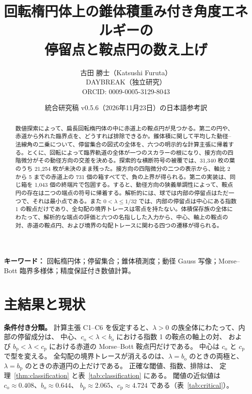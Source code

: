 \documentclass[11pt,a4paper]{article}
\title{回転楕円体上の錐体積重み付き角度エネルギーの\\停留点と鞍点円の数え上げ}
\author{古田 勝士（Katsushi Furuta）\\DAYBREAK（独立研究）\\\small ORCID: 0009-0005-3129-8043}
\date{統合研究稿 v0.5.6（2026年11月23日）の日本語参考訳}
\numberwithin{equation}{section}
\theoremstyle{jplain}
\theoremstyle{jplain}
\theoremstyle{jplain}
\newcommand{\cO}{c_{\mathrm o}}
\newcommand{\bO}{b_{\mathrm o}}
\newcommand{\cP}{c_{\mathrm p}}
\newcommand{\bP}{b_{\mathrm p}}
\begin{document}
\maketitle
\begin{center}\small
{}
\end{center}
\begin{abstract}
数値探索によって、扁長回転楕円体の中に赤道上の鞍点円が見つかる。第二の円や、赤道から外れた臨界点を、どうすれば排除できるか。錐体積に関して平均した動径–法線角の二乗について、停留集合の図式の全体を、六つの明示的な計算主張に帰着する。とくに、回転によって臨界軌道の全体が一つのスカラーの根になり、接方向の四階微分がその動径方向の交差を決める。探索的な横断符号の被覆では、31,340 枚の葉のうち 21,254 枚が未決のまま残った。接方向の四階微分の二つの表示から、軸比 2 から 5 までの赤道上の 731 個の箱すべてで、負の上界が得られる。第二の実装は、同じ箱を 1,043 個の終端片で包囲する。すると、動径方向の狭義単調性によって、鞍点円の存在は二つの端点の符号に帰着する。解析的には、球では内部の停留点はただ一つで、それは最小点である。また $0<\lambda\le 1/32$ では、内部の停留点は中心にある指数 1 の鞍点だけであり、全勾配の境界トレースは零点を持たない。体積保存族の全体にわたって、解析的な端点の評価と六つの名指しした入力から、中心、軸上の鞍点の対、赤道の鞍点円、および境界の勾配トレースに関わる四つの遷移が得られる。
\end{abstract}
\noindent\textbf{キーワード：} 回転楕円体；停留集合；錐体積測度；動径 Gauss 写像；Morse--Bott 臨界多様体；精度保証付き数値計算。

\section*{主結果と現状}
\noindent\textbf{条件付き分類。}
計算主張 C1--C6 を仮定すると、$\lambda>0$ の族全体にわたって、内部の停留成分は、
中心、$\cO<\lambda<\bO$ における指数 1 の鞍点の軸上の対、
および $\bP<\lambda<\cP$ における赤道の Morse--Bott 鞍点円だけである。
中心は $\cO$ と $\cP$ で型を変える。
全勾配の境界トレースが消えるのは、$\lambda=\bO$ のときの両極と、
$\lambda=\bP$ のときの赤道円の上だけである。
正確な閾値、指数、排除は、
定理~\ref{thm:classification} と表~\ref{tab:classification} にある。
閾値の近似値は $\cO\approx0.408$、$\bO\approx0.644$、
$\bP\approx2.065$、$\cP\approx4.724$ である（表~\ref{tab:critical}）。
\end{document}
